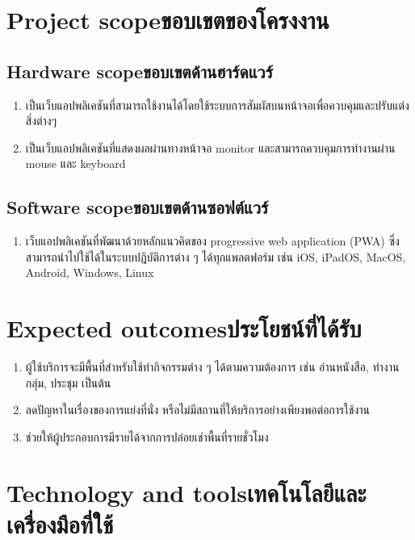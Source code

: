 \section{\ifenglish Project scope\else ขอบเขตของโครงงาน\fi}

\subsection{\ifenglish Hardware scope\else ขอบเขตด้านฮาร์ดแวร์\fi}
\begin{enumerate}
    \item เป็นเว็บแอปพลิเคชันที่สามารถใช้งานได้โดยใช้ระบบการสัมผัสบนหน้าจอเพื่อควบคุมและปรับแต่งสิ่งต่างๆ
    \item เป็นเว็บแอปพลิเคชันที่แสดงผลผ่านทางหน้าจอ monitor และสามารถควบคุมการทำงานผ่าน mouse และ keyboard
\end{enumerate}

\subsection{\ifenglish Software scope\else ขอบเขตด้านซอฟต์แวร์\fi}
\begin{enumerate}
    \item เว็บแอปพลิเคชันที่พัฒนาด้วยหลักแนวคิดของ progressive web application (PWA) ซึ่งสามารถนำไปใช้ได้ในระบบปฎิบัติการต่าง ๆ ได้ทุกแพลตฟอร์ม เช่น iOS, iPadOS, MacOS, Android, Windows, Linux
\end{enumerate}

\section{\ifenglish Expected outcomes\else ประโยชน์ที่ได้รับ\fi}
\begin{enumerate}
    \item ผู้ใช้บริการจะมีพื้นที่สำหรับใช้ทำกิจกรรมต่าง ๆ ได้ตามความต้องการ เช่น อ่านหนังสือ, ทำงานกลุ่ม, ประชุม เป็นต้น
    \item ลดปัญหาในเรื่องของการแย่งที่นั่ง หรือไม่มีสถานที่ให้บริการอย่างเพียงพอต่อการใช้งาน
    \item ช่วยให้ผู้ประกอบการมีรายได้จากการปล่อยเช่าพื้นที่รายชั่วโมง
\end{enumerate}

\section{\ifenglish Technology and tools\else เทคโนโลยีและเครื่องมือที่ใช้\fi}


